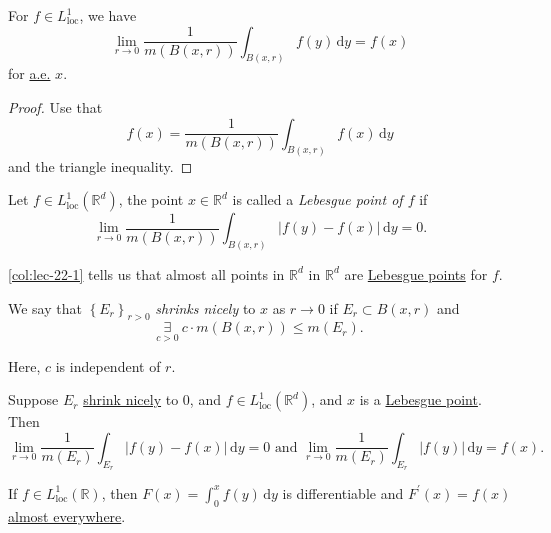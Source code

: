 \begin{corollary}\label{col:lec-22-2}
	For \(f\in L^1_{\text{loc} }\), we have
	\[
		\lim_{r \to 0} \frac{1}{m(B(x, r))}\int_{B(x, r)}^{} f(y) \,\mathrm{d}y = f(x)
	\]
	for \hyperref[def:mu-almost-everywhere]{a.e.} \(x\).
\end{corollary}
\begin{proof}
	Use that
	\[
		f(x) = \frac{1}{m(B(x, r))}\int _{B(x, r)} f(x)\,\mathrm{d} y
	\]
	and the triangle inequality.
\end{proof}

\begin{definition}\label{def:Lebesgue-point}
	Let \(f\in L^1_{\text{loc}}(\mathbb{R} ^d)\), the point \(x\in \mathbb{R} ^d\) is called a \emph{Lebesgue point of \(f\)} if
	\[
		\lim_{r \to 0} \frac{1}{m(B(x, r))}\int _{B(x, r)}\left\vert f(y) - f(x) \right\vert \,\mathrm{d} y = 0.
	\]
\end{definition}

\begin{remark}
	\autoref{col:lec-22-1} tells us that almost all points in \(\mathbb{R} ^d\) in \(\mathbb{R} ^d\) are \hyperref[def:Lebesgue-point]{Lebesgue points}  for \(f\).
\end{remark}

\begin{definition}\label{def:shrink-nicely}
	We say that \(\left\{E_{r} \right\}_{r>0}\) \emph{shrinks nicely} to \(x\) as \(r\to 0\) if \(E_{r} \subset B(x, r)\) and
	\[
		\underset{c>0}{\exists } \ c\cdot m(B(x, r)) \leq m(E_{r} ).
	\]
\end{definition}

\begin{note}
	Here, \(c\) is independent of \(r\).
\end{note}

\begin{corollary}
	Suppose \(E_r\) \hyperref[def:shrink-nicely]{shrink nicely} to \(0\), and \(f\in L^1_{\text{loc}}(\mathbb{R} ^d)\), and \(x\) is a \hyperref[def:Lebesgue-point]{Lebesgue point}. Then
	\[
		\lim_{r \to 0} \frac{1}{m(E_{r} )} \int _{E_{r}}\left\vert f(y) - f(x) \right\vert \,\mathrm{d} y= 0\text{ and }
		\lim_{r \to 0} \frac{1}{m(E_{r} )} \int _{E_{r}}\left\vert f(y) \right\vert \,\mathrm{d} y= f(x).
	\]
\end{corollary}

\begin{corollary}
	If \(f\in L^1_{\text{loc} }(\mathbb{R} ) \), then \(F(x)= \int_{0}^x f(y)\,\mathrm{d} y\) is differentiable and \(F^\prime (x)=f(x)\) \hyperref[def:mu-almost-everywhere]{almost everywhere}.
\end{corollary}